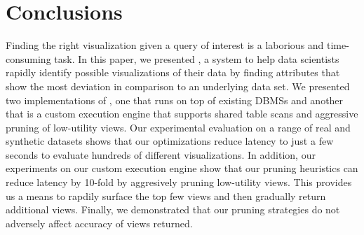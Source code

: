 
\section{Conclusions}
\label{sec:conc}

Finding the right visualization given a query of interest is a
laborious and time-consuming task.
In this paper, we presented \VizRecDB, a system to help data scientists 
rapidly identify possible visualizations of their data by finding
attributes that show the most deviation in comparison to an underlying data set.
We presented two implementations of \VizRecDB, one that runs on top of existing
DBMSs and another that is a custom execution engine that supports shared table scans
and aggressive pruning of low-utility views.
Our experimental evaluation on a range of real and synthetic datasets shows that
our optimizations reduce latency to just a few seconds to evaluate hundreds of different
visualizations.
In addition, our experiments on our custom execution engine show that our pruning
heuristics can reduce latency by 10-fold by aggresively pruning low-utility views.
This provides us a means to rapdily surface the top few views and then
gradually return additional views.
Finally, we demonstrated that our pruning
strategies do not adversely affect accuracy of views returned.